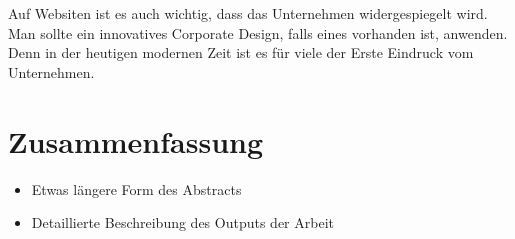 Auf Websiten ist es auch wichtig, dass das Unternehmen widergespiegelt wird. Man sollte ein innovatives Corporate Design, falls eines vorhanden ist, anwenden. Denn in der heutigen modernen Zeit ist es für viele der Erste Eindruck vom Unternehmen.

\chapter{Zusammenfassung}
\begin{itemize}
	\item Etwas längere Form des Abstracts
	\item Detaillierte Beschreibung des Outputs der Arbeit
\end{itemize}